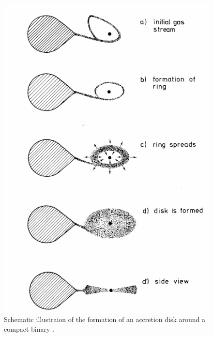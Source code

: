 \begin{figure}[]
        \centering
\includegraphics[scale=.3]{assets/images/accretiondisk.png}
\caption{Schematic illustraion of the formation of an accretion disk around a compact binary \citep{verbunt_accretion_1982}.}
\label{fig:roche}
\end{figure}


